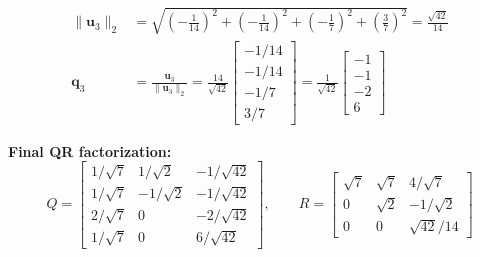 \begin{align*}
    \|\mathbf{u}_3\|_2         & = \sqrt{\left(-\frac{1}{14}\right)^2 + \left(-\frac{1}{14}\right)^2 + \left(-\frac{1}{7}\right)^2 + \left(\frac{3}{7}\right)^2}  = \frac{\sqrt{42}}{14}                                                                                           \\
    \mathbf{q}_3               & = \frac{\mathbf{u}_3}{\|\mathbf{u}_3\|_2} = \frac{14}{\sqrt{42}} \begin{bmatrix} -1/14 \\ -1/14 \\ -1/7 \\ 3/7 \end{bmatrix}                                              = \frac{1}{\sqrt{42}} \begin{bmatrix} -1 \\ -1 \\ -2 \\ 6 \end{bmatrix}
\end{align*}

\textbf{Final QR factorization:}
\[
    Q  = \begin{bmatrix}
        1/\sqrt{7} & 1/\sqrt{2}  & -1/\sqrt{42} \\
        1/\sqrt{7} & -1/\sqrt{2} & -1/\sqrt{42} \\
        2/\sqrt{7} & 0           & -2/\sqrt{42} \\
        1/\sqrt{7} & 0           & 6/\sqrt{42}
    \end{bmatrix}, \qquad
    R  = \begin{bmatrix}
        \sqrt{7} & \sqrt{7} & 4/\sqrt{7}   \\
        0        & \sqrt{2} & -1/\sqrt{2}  \\
        0        & 0        & \sqrt{42}/14
    \end{bmatrix}
\]

